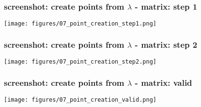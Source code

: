 \documentclass{beamer}
\begin{document}
\begin{frame}
\frametitle{screenshot: create points from $\lambda$ - matrix: step 1}
\texttt{[image: figures/07\_point\_creation\_step1.png]}
\end{frame}
\begin{frame}
\frametitle{screenshot: create points from $\lambda$ - matrix: step 2}
\texttt{[image: figures/07\_point\_creation\_step2.png]}
\end{frame}
\begin{frame}
\frametitle{screenshot: create points from $\lambda$ - matrix: valid}
\texttt{[image: figures/07\_point\_creation\_valid.png]}
\end{frame}
\end{document}
